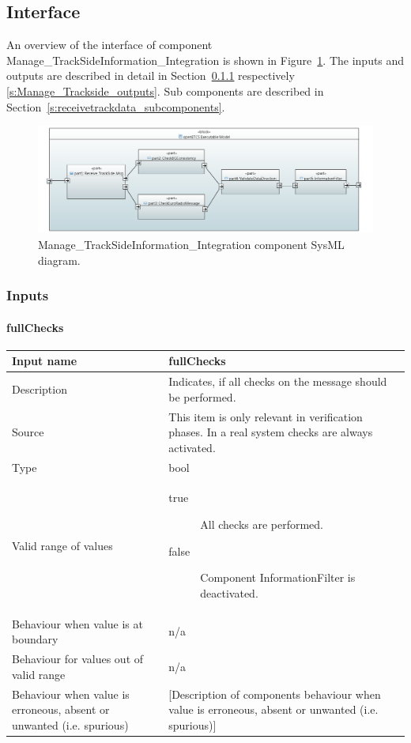 \subsection{Interface}

An overview of the interface of component Manage\_TrackSideInformation\_Integration is shown in Figure~\ref{f:receiveAndCheckConsistencyArch}. The inputs and outputs are described in detail in Section~\ref{s:Manage_Trackside_inputs} respectively \ref{s:Manage_Trackside_outputs}. Sub components are described in Section~\ref{s:receivetrackdata_subcomponents}.

\begin{figure}
\center
\includegraphics[width=\textwidth]{./images/Input-Messages4.PNG}
\caption{Manage\_TrackSideInformation\_Integration component SysML diagram.}\label{f:receiveAndCheckConsistencyArch}
\end{figure}


\subsubsection{Inputs}\label{s:Manage_Trackside_inputs}

\paragraph{fullChecks}

\begin{longtable}{p{}p{}}
\toprule
Input name				& fullChecks \\
\midrule
Description				& Indicates, if all checks on the message should be performed. \\
\midrule
Source					& This item is only relevant in verification phases. In a real system checks are always activated. \\ 
\midrule
Type					& bool \\
\midrule
Valid range of values	& 
\begin{description}
\item[true] All checks are performed.
\item[false] Component InformationFilter is deactivated.
\end{description} \\
\midrule
Behaviour when value is at boundary	& n/a \\
\midrule
Behaviour for values out of valid range	& n/a \\
\midrule
Behaviour when value is erroneous, absent or unwanted (i.e. spurious) & [Description of components behaviour when value is erroneous, absent or unwanted (i.e. spurious)] \\
\bottomrule
\end{longtable}


